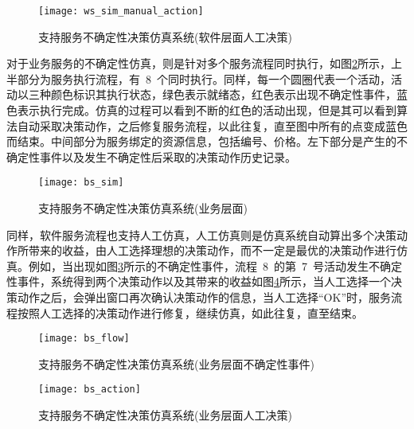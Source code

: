 \begin{figure}[htbp]
    \centering
    \texttt{[image: ws\_sim\_manual\_action]}
    \caption{支持服务不确定性决策仿真系统(软件层面人工决策)}\label{figure:ws_sim_manual_action}
    \vspace{-1em}
\end{figure}

对于业务服务的不确定性仿真，则是针对多个服务流程同时执行，如图\ref{figure:bs_sim}所示，上半部分为服务执行流程，有~8~个同时执行。同样，每一个圆圈代表一个活动，活动以三种颜色标识其执行状态，绿色表示就绪态，红色表示出现不确定性事件，蓝色表示执行完成。仿真的过程可以看到不断的红色的活动出现，但是其可以看到算法自动采取决策动作，之后修复服务流程，以此往复，直至图中所有的点变成蓝色而结束。中间部分为服务绑定的资源信息，包括编号、价格。左下部分是产生的不确定性事件以及发生不确定性后采取的决策动作历史记录。

\begin{figure}[htbp]
    \centering
    \texttt{[image: bs\_sim]}
    \caption{支持服务不确定性决策仿真系统(业务层面)}\label{figure:bs_sim}
    \vspace{-1em}
\end{figure}

同样，软件服务流程也支持人工仿真，人工仿真则是仿真系统自动算出多个决策动作所带来的收益，由人工选择理想的决策动作，而不一定是最优的决策动作进行仿真。例如，当出现如图\ref{figure:bs_flow}所示的不确定性事件，流程~8~的第~7~号活动发生不确定性事件，系统得到两个决策动作以及其带来的收益如图\ref{figure:bs_action}所示，当人工选择一个决策动作之后，会弹出窗口再次确认决策动作的信息，当人工选择“OK”时，服务流程按照人工选择的决策动作进行修复，继续仿真，如此往复，直至结束。

\begin{figure}[htbp]
    \centering
    \texttt{[image: bs\_flow]}
    \caption{支持服务不确定性决策仿真系统(业务层面不确定性事件)}\label{figure:bs_flow}
    \vspace{-1em}
\end{figure}


\begin{figure}[htbp]
    \centering
    \texttt{[image: bs\_action]}
    \caption{支持服务不确定性决策仿真系统(业务层面人工决策)}\label{figure:bs_action}
    \vspace{-1em}
\end{figure}




